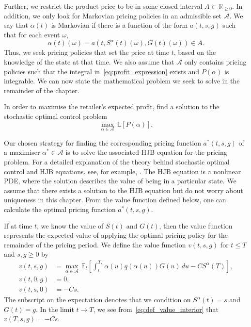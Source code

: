 \documentclass[main.tex]{subfiles}
\begin{document}
Further, we restrict the product price to be in some closed  interval
$A\subset\mathbb{R}_{\geq 0}$.
In addition, we only look for Markovian pricing policies in an
admissible set $\mathcal{A}$. We say that $\alpha(t)$ is Markovian if
there is a function of the form $a(t,s,g)$ such that for each event $\omega$,
\begin{equation}
  \alpha(t)(\omega) = a(t,S^\alpha(t)(\omega), G(t)(\omega)) \in A.
\end{equation}
Thus, we seek pricing policies that set the price at time $t$, based
on the knowledge of the state at that time. We also assume that
$\mathcal{A}$ only contains pricing policies such that the integral
in~\eqref{eq:profit_expression} exists and
$P(\alpha)$ is integrable. We can now state the mathematical problem we
seek to solve in the remainder of the chapter.
\begin{mydef}
  In order to maximise the retailer's expected profit, find a solution to
  the stochastic optimal control problem
  \begin{equation}\label{eq:pricing_problem}
    \max_{\alpha\in \mathcal{A}}\,\mathbb{E}[P(\alpha)].
  \end{equation}
\end{mydef}
Our chosen strategy for finding the corresponding pricing function $a^*(t,s,g)$
of a maximiser $\alpha^*\in\mathcal{A}$ is to solve the associated HJB
equation for the pricing problem.
For a detailed explanation of the theory behind stochastic optimal control and
HJB equations, see, for example, \citet{pham2009continuous}.
The HJB equation is a nonlinear PDE, where the solution describes the
value of being in a particular state. We assume that there exists a
solution to the HJB equation but do not worry about
uniqueness in this chapter. From the
value function defined below, one can
calculate the optimal pricing function $a^*(t,s,g)$.

If at time $t$, we know the value of $S(t)$ and $G(t)$, then the value
function represents the expected value of applying the optimal pricing
policy for the remainder of the pricing period.
We define the value function $v(t,s,g)$ for $t \leq T$ and $s,g\geq
0$ by
\begin{align}
  v(t,s,g) &=
             \max_{\alpha \in \mathcal{A}}\,
             \mathbb{E}_{t}\left[
             \int_t^{T_h}\alpha(u)q(\alpha(u))G(u)\,du-CS^\alpha(T)
             \right],\label{eq:def_value_interior}\\
  v(t,0,g)&= 0,\\
  v(t,s,0)&=-Cs.
\end{align}
The subscript on the expectation denotes that we condition on
$S^\alpha(t)=s$ and $G(t)=g$.
In the limit $t\to T$, we see from~\eqref{eq:def_value_interior} that
$v(T,s,g)=-Cs$.
\end{document}
